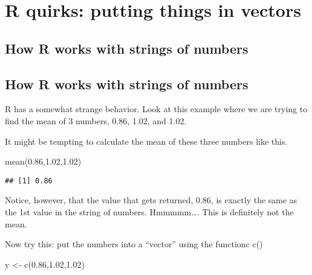\documentclass[
]{book}
\newenvironment{Shaded}{\begin{snugshade}}{\end{snugshade}}
\newcommand{\FloatTok}[1]{\textcolor[rgb]{0.00,0.00,0.81}{#1}}
\newcommand{\FunctionTok}[1]{\textcolor[rgb]{0.00,0.00,0.00}{#1}}
\newcommand{\NormalTok}[1]{#1}
\newcommand{\OtherTok}[1]{\textcolor[rgb]{0.56,0.35,0.01}{#1}}
\begin{document}
\hypertarget{r-quirks-putting-things-in-vectors}{%
\chapter{R quirks: putting things in vectors}\label{r-quirks-putting-things-in-vectors}}

\hypertarget{how-r-works-with-strings-of-numbers}{%
\section{How R works with strings of numbers}\label{how-r-works-with-strings-of-numbers}}

\hypertarget{how-r-works-with-strings-of-numbers-1}{%
\section{How R works with strings of numbers}\label{how-r-works-with-strings-of-numbers-1}}

R has a somewhat strange behavior. Look at this example where we are trying to find the mean of 3 numbers, 0.86, 1.02, and 1.02.

It might be tempting to calculate the mean of these three numbers like this.

\begin{Shaded}
\begin{Highlighting}[]
\FunctionTok{mean}\NormalTok{(}\FloatTok{0.86}\NormalTok{,}\FloatTok{1.02}\NormalTok{,}\FloatTok{1.02}\NormalTok{)}
\end{Highlighting}
\end{Shaded}

\begin{verbatim}
## [1] 0.86
\end{verbatim}

Notice, however, that the value that gets returned, 0.86, is exactly the same as the 1st value in the string of numbers. Hmmmmm\ldots. This is definitely not the mean.

Now try this: put the numbers into a ``vector'' using the functionc c()

\begin{Shaded}
\begin{Highlighting}[]
\NormalTok{y }\OtherTok{\textless{}{-}} \FunctionTok{c}\NormalTok{(}\FloatTok{0.86}\NormalTok{,}\FloatTok{1.02}\NormalTok{,}\FloatTok{1.02}\NormalTok{)}
\end{Highlighting}
\end{Shaded}
\end{document}
